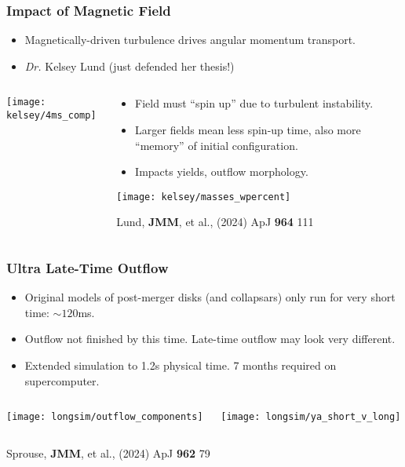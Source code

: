 \documentclass[]{beamer}
\begin{document}
\begin{frame}
  \frametitle{Impact of Magnetic Field}
  \begin{itemize}
  \item Magnetically-driven turbulence drives angular momentum transport.
  \item \textit{Dr.} Kelsey Lund (just defended her thesis!)
  \end{itemize}
  \begin{columns}
    \begin{column}{2.5cm}
      \begin{center}
        \texttt{[image: kelsey/4ms\_comp]}
      \end{center}
    \end{column}
    \begin{column}{9.5cm}
      \begin{itemize}
      \item Field must ``spin up'' due to turbulent instability.
      \item Larger fields mean less spin-up time, also more ``memory''
        of initial configuration.
      \item Impacts yields, outflow morphology.
      \end{itemize}
      \begin{center}
        \texttt{[image: kelsey/masses\_wpercent]}
      \end{center}
      {\footnotesize Lund, \textbf{JMM}, et al., (2024) ApJ \textbf{964} 111}
    \end{column}
  \end{columns}
\end{frame}

\begin{frame}
  \frametitle{Ultra Late-Time Outflow}
  \begin{itemize}
  \item Original models of post-merger disks (and collapsars) only run
    for very short time: $\sim 120$ms.
  \item Outflow not finished by this time. Late-time outflow may look
    very different.
  \item Extended simulation to 1.2s physical time. 7 months required
    on supercomputer.
  \end{itemize}
  \begin{columns}
    \begin{column}{6cm}
      \begin{center}
        \texttt{[image: longsim/outflow\_components]}
      \end{center}
    \end{column}
    \begin{column}{6cm}
      \begin{center}
        \texttt{[image: longsim/ya\_short\_v\_long]}
      \end{center}
    \end{column}
  \end{columns}
  {\footnotesize Sprouse, \textbf{JMM}, et al., (2024) ApJ \textbf{962} 79}
\end{frame}
\end{document}
